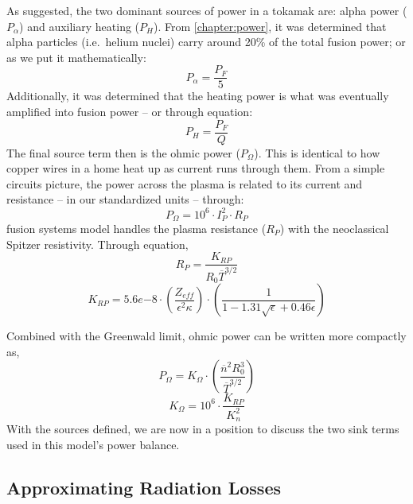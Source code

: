 As suggested, the two dominant sources of power in a tokamak are: alpha power ($P_\alpha$) and auxiliary heating ($P_H$). From \cref{chapter:power}, it was determined that alpha particles (i.e.\ helium nuclei) carry around 20\% of the total fusion power; or as we put it mathematically:
\begin{equation}
	\label{eq:palpha}
	P_\alpha = \frac{P_F}{5}
\end{equation}
Additionally, it was determined that the heating power is what was eventually amplified into fusion power -- or through equation:
\begin{equation}
	\label{eq:ph}
	P_H = \frac{P_F}{Q}
\end{equation}
The final source term then is the ohmic power ($P_\Omega$). This is identical to how copper wires in a home heat up as current runs through them. From a simple circuits picture, the power across the plasma is related to its current and resistance -- in our standardized units -- through:
\begin{equation}
	\label{eq:pohmic_basic}
	P_\Omega = 10^6 \cdot I_P^2 \cdot R_P
\end{equation}
  fusion systems model handles the plasma resistance ($R_P$)  with the neoclassical Spitzer resistivity. Through equation,
\begin{equation}
	\label{eq:rp}
	R_P = \frac{K_{RP}}{R_0 \overline T ^ {3/2}}
\end{equation}
\begin{equation}
	K_{RP} = 5.6e{-8} \cdot \left( \frac{ Z_{eff} }{ \epsilon^2 \kappa } \right) \cdot \left( \frac{1}{ 1 - 1.31 \sqrt{ \epsilon } + 0.46 \epsilon } \right)
\end{equation}

Combined with the Greenwald limit, ohmic power can be written more compactly as,
\begin{equation}
	\label{eq:pohmic}
	P_\Omega = K_\Omega \cdot \left( \frac{ \overline n ^ 2 R_0^3 }{\overline T ^ {3/2}} \right)
\end{equation}
\begin{equation}
	K_\Omega = 10^6 \cdot \frac{K_{RP}}{K_n^2}
\end{equation}
With the sources defined, we are now in a position to discuss the two sink terms used in this model's power balance.

\subsection{Approximating Radiation Losses}

